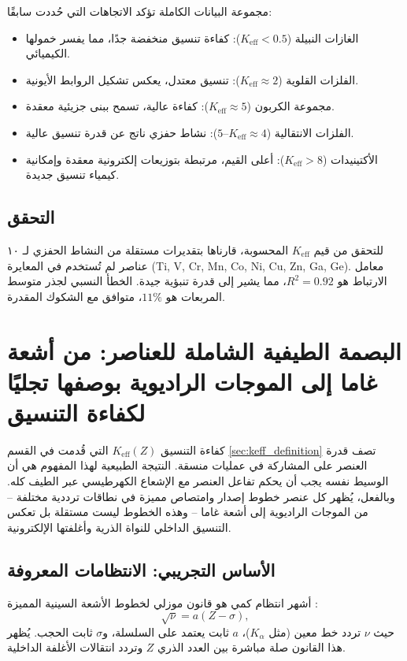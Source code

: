 \documentclass[12pt,a4paper]{article}
\theoremstyle{remark}
\newcommand{\Keff}{K_{\mathrm{eff}}}
\begin{document}
	مجموعة البيانات الكاملة تؤكد الاتجاهات التي حُددت سابقًا:
	\begin{itemize}
		\item الغازات النبيلة ($\Keff < 0.5$): كفاءة تنسيق منخفضة جدًا، مما يفسر خمولها الكيميائي.
		\item الفلزات القلوية ($\Keff \approx 2$): تنسيق معتدل، يعكس تشكيل الروابط الأيونية.
		\item مجموعة الكربون ($\Keff \approx 5$): كفاءة عالية، تسمح ببنى جزيئية معقدة.
		\item الفلزات الانتقالية ($\Keff \approx 4$–$5$): نشاط حفزي ناتج عن قدرة تنسيق عالية.
		\item الأكتينيدات ($\Keff > 8$): أعلى القيم، مرتبطة بتوزيعات إلكترونية معقدة وإمكانية كيمياء تنسيق جديدة.
	\end{itemize}
	
	\subsection{التحقق}
	
	للتحقق من قيم $\Keff$ المحسوبة، قارناها بتقديرات مستقلة من النشاط الحفزي لـ ١٠ عناصر لم تُستخدم في المعايرة (Ti, V, Cr, Mn, Co, Ni, Cu, Zn, Ga, Ge). معامل الارتباط هو $R^2 = 0.92$، مما يشير إلى قدرة تنبؤية جيدة. الخطأ النسبي لجذر متوسط المربعات هو $11\%$، متوافق مع الشكوك المقدرة.
	
	\section{البصمة الطيفية الشاملة للعناصر: من أشعة غاما إلى الموجات الراديوية بوصفها تجليًا لكفاءة التنسيق}
	\label{sec:spectral_signature}
	
	كفاءة التنسيق \(K_{\mathrm{eff}}(Z)\) التي قُدمت في القسم \ref{sec:keff_definition} تصف قدرة العنصر على المشاركة في عمليات منسقة. النتيجة الطبيعية لهذا المفهوم هي أن الوسيط نفسه يجب أن يحكم تفاعل العنصر مع الإشعاع الكهرطيسي عبر الطيف كله. وبالفعل، يُظهر كل عنصر خطوط إصدار وامتصاص مميزة في نطاقات ترددية مختلفة – من الموجات الراديوية إلى أشعة غاما – وهذه الخطوط ليست مستقلة بل تعكس التنسيق الداخلي للنواة الذرية وأغلفتها الإلكترونية.
	
	\subsection{الأساس التجريبي: الانتظامات المعروفة}
	
	أشهر انتظام كمي هو قانون موزلي لخطوط الأشعة السينية المميزة \cite{Moseley1913}:
	\begin{equation}
		\sqrt{\nu} = a (Z - \sigma),
		\label{eq:moseley}
	\end{equation}
	حيث \(\nu\) تردد خط معين (مثل \(K_\alpha\))، \(a\) ثابت يعتمد على السلسلة، و\(\sigma\) ثابت الحجب. يُظهر هذا القانون صلة مباشرة بين العدد الذري \(Z\) وتردد انتقالات الأغلفة الداخلية.
	
\end{document}
